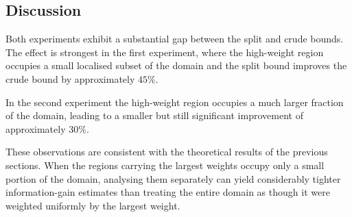 \subsection{Discussion}

Both experiments exhibit a substantial gap between the split and crude
bounds. The effect is strongest in the first experiment, where the
high-weight region occupies a small localised subset of the domain and
the split bound improves the crude bound by approximately $45\%$.

In the second experiment the high-weight region occupies a much larger
fraction of the domain, leading to a smaller but still significant
improvement of approximately $30\%$.

These observations are consistent with the theoretical results of the
previous sections. When the regions carrying the largest weights occupy
only a small portion of the domain, analysing them separately can yield
considerably tighter information-gain estimates than treating the entire
domain as though it were weighted uniformly by the largest weight.
